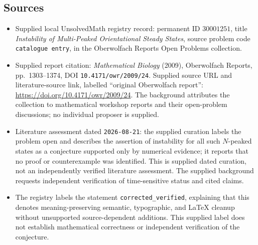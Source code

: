 \documentclass[11pt]{article}
\begin{document}
\subsection{Sources}
\begin{itemize}
\item Supplied local UnsolvedMath registry record: permanent ID \(30001251\), title \emph{Instability of Multi-Peaked Orientational Steady States}, source problem code \texttt{catalogue entry}, in the Oberwolfach Reports Open Problems collection.
\item Supplied report citation: \emph{Mathematical Biology} (2009), Oberwolfach Reports, pp.\ 1303--1374, DOI \texttt{10.4171/owr/2009/24}. Supplied source URL and literature-source link, labelled ``original Oberwolfach report'': \url{https://doi.org/10.4171/owr/2009/24}. The background attributes the collection to mathematical workshop reports and their open-problem discussions; no individual proposer is supplied.
\item Literature assessment dated \texttt{2026-08-21}: the supplied curation labels the problem open and describes the assertion of instability for all such \(N\)-peaked states as a conjecture supported only by numerical evidence; it reports that no proof or counterexample was identified. This is supplied dated curation, not an independently verified literature assessment. The supplied background requests independent verification of time-sensitive status and cited claims.
\item The registry labels the statement \texttt{corrected\_verified}, explaining that this denotes meaning-preserving semantic, typographic, and LaTeX cleanup without unsupported source-dependent additions. This supplied label does not establish mathematical correctness or independent verification of the conjecture.
\end{itemize}
\end{document}
